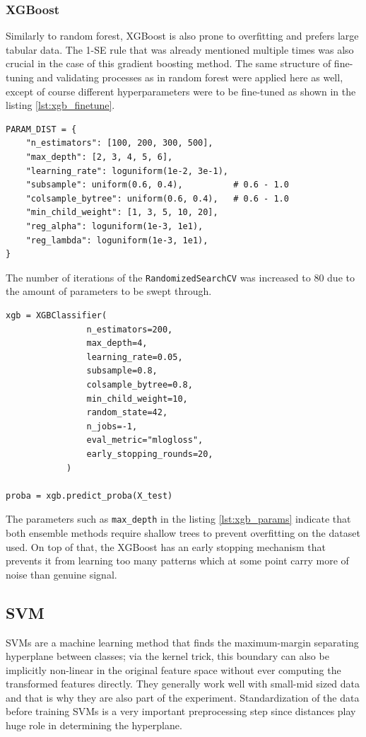 \documentclass{article}
\begin{document}
\subsubsection{XGBoost}
Similarly to random forest, XGBoost is also prone to overfitting and prefers large tabular data. The 1-SE rule that was already mentioned multiple times was also crucial in the case of this gradient boosting method. The same structure of fine-tuning and validating processes as in random forest were applied here as well, except of course different hyperparameters were to be fine-tuned as shown in the listing \ref{lst:xgb_finetune}.

\begin{lstlisting}[style=pythonstyle, caption={Selection of XGB parameters to be fine-tuned}, label={lst:xgb_finetune}]
PARAM_DIST = {
    "n_estimators": [100, 200, 300, 500],
    "max_depth": [2, 3, 4, 5, 6],
    "learning_rate": loguniform(1e-2, 3e-1),
    "subsample": uniform(0.6, 0.4),          # 0.6 - 1.0
    "colsample_bytree": uniform(0.6, 0.4),   # 0.6 - 1.0
    "min_child_weight": [1, 3, 5, 10, 20],
    "reg_alpha": loguniform(1e-3, 1e1),
    "reg_lambda": loguniform(1e-3, 1e1),
}
\end{lstlisting}
The number of iterations of the \texttt{RandomizedSearchCV} was increased to 80 due to the amount of parameters to be swept through.

\newpage
\begin{lstlisting}[style=pythonstyle, caption={Fine-tuned XGB parameters}, label={lst:xgb_params}]
xgb = XGBClassifier(
                n_estimators=200,
                max_depth=4,
                learning_rate=0.05,
                subsample=0.8,
                colsample_bytree=0.8,
                min_child_weight=10,
                random_state=42,
                n_jobs=-1,
                eval_metric="mlogloss",
                early_stopping_rounds=20,
            )

proba = xgb.predict_proba(X_test)
\end{lstlisting}

The parameters such as \texttt{max\_depth} in the listing \ref{lst:xgb_params} indicate that both ensemble methods require shallow trees to prevent overfitting on the dataset used. On top of that, the XGBoost has an early stopping mechanism that prevents it from learning too many patterns which at some point carry more of noise than genuine signal.  




\subsection{SVM}
SVMs are a machine learning method that finds the maximum-margin separating hyperplane between classes; via the kernel trick, this boundary can also be implicitly non-linear in the original feature space without ever computing the transformed features directly. They generally work well with small-mid sized data and that is why they are also part of the experiment. Standardization of the data before training SVMs is a very important preprocessing step since distances play huge role in determining the hyperplane.
\end{document}
